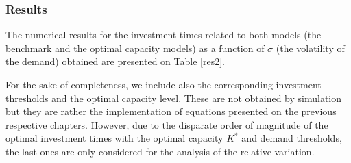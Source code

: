 %
%
%
%
%
%
%


\subsubsection{Results}

The numerical results for the investment times related to both models (the benchmark and the optimal capacity models) as a function of $\sigma$ (the volatility of the demand) obtained are presented on Table \ref{res2}. 

For the sake of completeness, we include also the corresponding investment thresholds and the optimal capacity level. These are not obtained by simulation but they are rather the implementation of equations presented on the previous respective chapters.
However, due to the disparate order of magnitude of the optimal investment times with the optimal capacity $K^*$ and demand thresholds, the last ones are only considered for the analysis of the relative variation.

